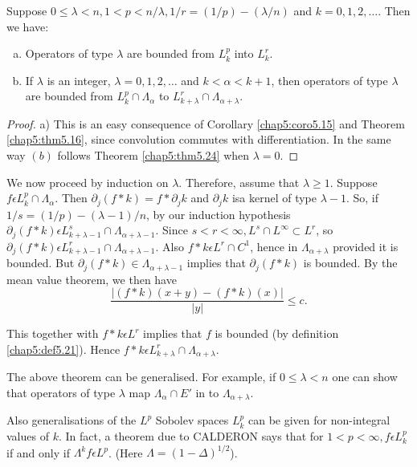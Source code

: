 \setcounter{thm}{29}
\begin{thm}\label{chap5:thm5.30} %
  Suppose $0 \leq \lambda < n,  1 < p < n/\lambda,  1/r = (1/p) -
  (\lambda /n)$ and $k = 0,1,2,\ldots$. Then we have:  
  \begin{enumerate}[a)]
  \item Operators of type $\lambda$ are bounded from $L_k^p$ into $L^r_k$.
  \item If $\lambda$ is an integer,  $\lambda = 0,1,2,\ldots$ and $k
    < \alpha < k+1$, then operators of type $\lambda$ are bounded from
    $L^p_k \cap \Lambda_{\alpha} $ to $L^r_{k+\lambda} \cap
    \Lambda_{\alpha + \lambda}$.
  \end{enumerate}
\end{thm}

\begin{proof}
  a) This is an easy consequence of Corollary \ref{chap5:coro5.15} and Theorem
  \ref{chap5:thm5.16}, since convolution commutes with
  differentiation. In the  same
  way $(b)$ follows Theorem \ref{chap5:thm5.24} when $\lambda =0$. 
\end{proof}

We now proceed by induction on $\lambda$. Therefore, assume that
$\lambda \geq 1$. Suppose $ f \epsilon L^p_k \cap
\Lambda_{\alpha}$. Then $\partial_j (f * k) = f * \partial _j k$ and
$\partial _j k$ 
is\pageoriginale a kernel of type $\lambda -1$. So, if  $1/s = (1/p)-(\lambda
-1)/n$, by our induction hypothesis $\partial_j(f * k)  \epsilon
L^s_{k+\lambda -1} \cap  \Lambda_{\alpha +\lambda -1}$.  Since $ s < r
< \infty,  L^s \cap L^\infty \subset L^r$,  so  $\partial_j ( f * k)
\epsilon L^r_{k+\lambda -1} \cap   \Lambda _{\alpha + \lambda
  -1}$. Also $f * k \epsilon L^r \cap C^1$, hence in $ \Lambda
_{\alpha + \lambda}$ provided it is bounded. But $\partial_j(f * k)\in
\Lambda_{\alpha+\lambda-1}$ implies that $\partial_j( f * k)$ is
bounded. By the mean value theorem, we then have 
$$
\frac{ | (f * k) (x+y)-(f * k)(x) | }{ | y  |} \le c.
$$ 

This together with $f * k \epsilon L^r$ implies that $f$ is bounded
(by 
definition \ref{chap5:def5.21}). Hence $ f * k \epsilon L^{r}_{k+\lambda
}\cap  \Lambda_{\alpha + \lambda}$. 

The above theorem can be generalised.  For example, if $0 \le \lambda
< n$ one can show that operators of type $\lambda $ map $ \Lambda
_{\alpha}\cap E'$ in to $ \Lambda_{\alpha +\lambda}$. 

Also generalisations of the $L^p$ Sobolev spaces $L^{p}_{k}$ can be
given for non-integral values of $k$. In fact, a theorem due to
CALDERON says that for $1 < p < \infty, f \epsilon L^p_k$ if and
only if $ \Lambda ^k f \epsilon L^p$. (Here $ \Lambda = (1 -\Delta)
^{1/2}$). 

